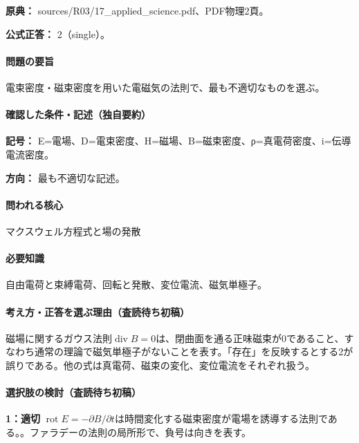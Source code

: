 \noindent\textbf{原典：} sources/R03/17\_applied\_science.pdf、PDF物理2頁。

\textbf{公式正答：} 2（single）。

\paragraph{問題の要旨} 電束密度・磁束密度を用いた電磁気の法則で、最も不適切なものを選ぶ。

\paragraph{確認した条件・記述（独自要約）}\mbox{}\par

\noindent\textbf{記号：} E=電場、D=電束密度、H=磁場、B=磁束密度、ρ=真電荷密度、i=伝導電流密度。\par

\noindent\textbf{方向：} 最も不適切な記述。\par

\paragraph{問われる核心} マクスウェル方程式と場の発散

\paragraph{必要知識} 自由電荷と束縛電荷、回転と発散、変位電流、磁気単極子。

\paragraph{考え方・正答を選ぶ理由（査読待ち初稿）} 磁場に関するガウス法則\(\operatorname{div}B=0\)は、閉曲面を通る正味磁束が0であること、すなわち通常の理論で磁気単極子がないことを表す。「存在」を反映するとする2が誤りである。他の式は真電荷、磁束の変化、変位電流をそれぞれ扱う。

\paragraph{選択肢の検討（査読待ち初稿）}\mbox{}\par

\noindent\textbf{1：適切} \(\operatorname{rot}E=-\partial B/\partial t\)は時間変化する磁束密度が電場を誘導する法則である。。ファラデーの法則の局所形で、負号は向きを表す。\par


